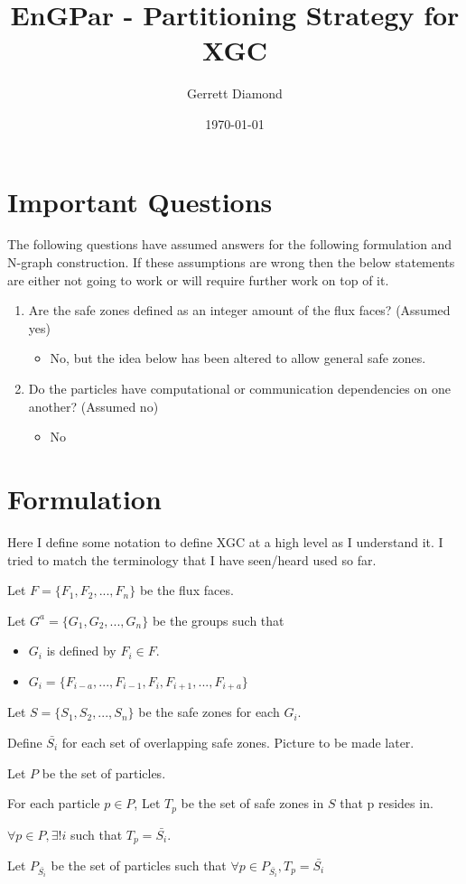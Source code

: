 \documentclass[a4paper]{article}
\title{EnGPar - Partitioning Strategy for XGC}
\author{Gerrett Diamond}
\date{\today}
\begin{document}
\maketitle

\section{Important Questions}
The following questions have assumed answers for the following formulation
and N-graph construction. If these assumptions are wrong then the below
statements are either not going to work or will require further work on
top of it.
\begin{enumerate}
\item Are the safe zones defined as an integer amount of the flux faces? (Assumed yes)
  {\color{red}
    \begin{itemize}
    \item No, but the idea below has been altered to allow general safe zones.
    \end{itemize}
  }
\item Do the particles have computational or communication dependencies on one another? (Assumed no)
  {\color{red}
    \begin{itemize}
    \item No
    \end{itemize}
  }
\end{enumerate}

\section{Formulation}
Here I define some notation to define XGC at a high level as I understand it. I tried to match the terminology that I have seen/heard used so far. \\

\begin{itemize}
\item Let $F = \{F_1,F_2, ..., F_n\}$ be the flux faces.
\item Let $G^a = \{G_1, G_2, ..., G_n\}$ be the groups such that
  \begin{itemize}
  \item $G_i$ is defined by $F_i\in F$.
  \item $G_i = \{F_{i-a},...,F_{i-1},F_i,F_{i+1},...,F_{i+a}\}$ 
  \end{itemize}
\item Let $S = \{S_1,S_2,...,S_n\}$ be the safe zones for each $G_i$.
  {\color{blue}
  \item Define $\bar{S_i}$ for each set of overlapping safe zones. Picture to be made later.
  }
\item Let $P$ be the set of particles.
\item For each particle $p\in P$, Let $T_p$ be the set of safe zones in $S$ that p resides in.   {\color{blue} $\forall p \in P, \exists ! i$ such that $T_p = \bar{S_i}$.
\item  Let $P_{\bar{S_i}}$ be the set of particles such that $\forall p \in P_{\bar{S_i}}, T_p = \bar{S_i}$
  }
\end{itemize}
\end{document}
